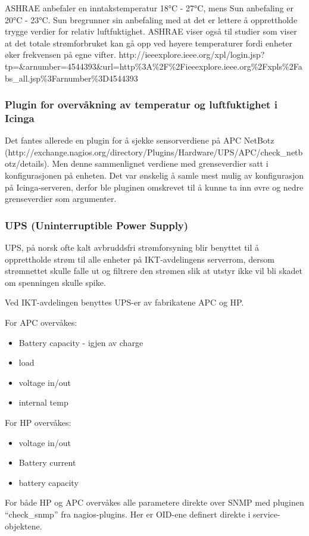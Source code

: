 ASHRAE anbefaler en inntakstemperatur 18°C - 27°C, mens Sun anbefaling er 20°C - 23°C. Sun bregrunner sin anbefaling med at det er lettere å opprettholde trygge verdier for relativ luftfuktighet. ASHRAE viser også til studier som viser at det totale strømforbruket kan gå opp ved høyere temperaturer fordi enheter øker frekvensen på egne vifter. http://ieeexplore.ieee.org/xpl/login.jsp?tp=\&arnumber=4544393\&url=http\%3A\%2F\%2Fieeexplore.ieee.org\%2Fxpls\%2Fabs\_all.jsp\%3Farnumber\%3D4544393

\subsubsection{Plugin for overvåkning av temperatur og luftfuktighet i Icinga}

Det fantes allerede en plugin for å sjekke sensorverdiene på APC NetBotz (http://exchange.nagios.org/directory/Plugins/Hardware/UPS/APC/check\_netbotz/details). Men denne sammenlignet verdiene med grenseverdier satt i konfigurasjonen på enheten. Det var ønskelig å samle mest mulig av konfigurasjon på Icinga-serveren, derfor ble pluginen omskrevet til å kunne ta inn øvre og nedre grenseverdier som argumenter.

\subsubsection{UPS (Uninterruptible Power Supply)}

UPS, på norsk ofte kalt avbruddsfri strømforsyning blir benyttet til å opprettholde strøm til alle enheter på IKT-avdelingens serverrom, dersom strømnettet skulle falle ut og filtrere den strømen slik at utstyr ikke vil bli skadet om spenningen skulle spike.

Ved IKT-avdelingen benyttes UPS-er av fabrikatene APC og HP.

For APC overvåkes:
\begin{itemize}
 	\item Battery capacity - igjen av charge
	\item load
	\item voltage in/out
	\item internal temp
\end{itemize}

For HP overvåkes:
\begin{itemize}
	\item voltage in/out
	\item Battery current
	\item battery capacity
\end{itemize}

For både HP og APC overvåkes alle parametere direkte over SNMP med pluginen “check\_snmp” fra nagios-plugins. Her er OID-ene definert direkte i service-objektene.
